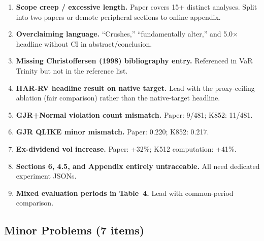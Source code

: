 \documentclass[12pt,a4paper]{article}
\begin{document}
\begin{enumerate}[label=\textcolor{warncolor}{M\arabic*}]
\item \textbf{Scope creep / excessive length.} Paper covers 15+ distinct analyses. Split into two papers or demote peripheral sections to online appendix.

\item \textbf{Overclaiming language.} ``Crushes,'' ``fundamentally alter,'' and 5.0$\times$ headline without CI in abstract/conclusion.

\item \textbf{Missing Christoffersen (1998) bibliography entry.} Referenced in VaR Trinity but not in the reference list.

\item \textbf{HAR-RV headline result on native target.} Lead with the proxy-ceiling ablation (fair comparison) rather than the native-target headline.

\item \textbf{GJR+Normal violation count mismatch.} Paper: 9/481; K852: 11/481.

\item \textbf{GJR QLIKE minor mismatch.} Paper: 0.220; K852: 0.217.

\item \textbf{Ex-dividend vol increase.} Paper: +32\%; K512 computation: +41\%.

\item \textbf{Sections 6, 4.5, and Appendix entirely untraceable.} All need dedicated experiment JSONs.

\item \textbf{Mixed evaluation periods in Table~4.} Lead with common-period comparison.
\end{enumerate}

\subsection*{Minor Problems (7 items)}
\end{document}
